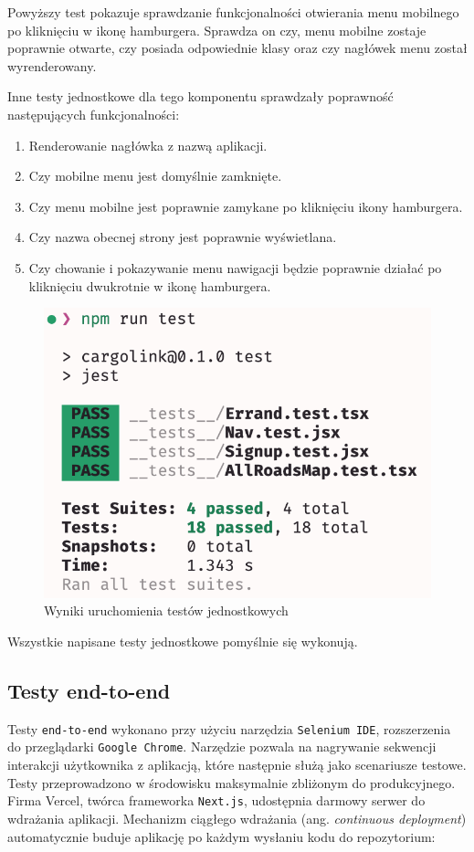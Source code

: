 Powyższy test pokazuje sprawdzanie funkcjonalności otwierania menu mobilnego po kliknięciu w ikonę hamburgera. Sprawdza on czy, menu mobilne zostaje poprawnie otwarte, czy posiada odpowiednie klasy oraz czy nagłówek menu został wyrenderowany.

Inne testy jednostkowe dla tego komponentu sprawdzały poprawność następujących funkcjonalności:
\begin{enumerate}
  \item Renderowanie nagłówka z nazwą aplikacji.
  \item Czy mobilne menu jest domyślnie zamknięte.
  \item Czy menu mobilne jest poprawnie zamykane po kliknięciu ikony hamburgera.
  \item Czy nazwa obecnej strony jest poprawnie wyświetlana.
  \item Czy chowanie i pokazywanie menu nawigacji będzie poprawnie działać po kliknięciu dwukrotnie w ikonę hamburgera.
\end{enumerate}

\begin{figure}[H]
	\centering
		\includegraphics[width=0.5\linewidth]{rozdzial2/testy_jednostkowe_wyniki.png}
	\caption{Wyniki uruchomienia testów jednostkowych}
	\label{Testy jednostkowe wyniki}
\end{figure}

Wszystkie napisane testy jednostkowe pomyślnie się wykonują.

\subsection{Testy end-to-end}

Testy \texttt{end-to-end} wykonano przy użyciu narzędzia \texttt{Selenium IDE}, rozszerzenia do przeglądarki \texttt{Google Chrome}. Narzędzie pozwala na nagrywanie sekwencji interakcji użytkownika z aplikacją, które następnie służą jako scenariusze testowe.
Testy przeprowadzono w środowisku maksymalnie zbliżonym do produkcyjnego. Firma Vercel, twórca frameworka \texttt{Next.js}, udostępnia darmowy serwer do wdrażania aplikacji. Mechanizm ciągłego wdrażania (ang. \emph{continuous deployment}) automatycznie buduje aplikację po każdym wysłaniu kodu do repozytorium:

